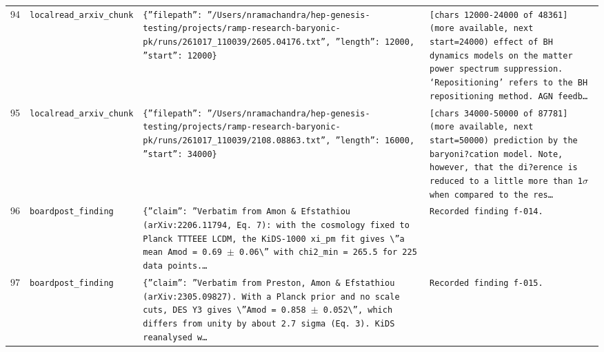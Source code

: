 \documentclass[11pt,a4paper]{article}
\begin{document}
\begin{longtable}{@{}p{}p{}p{}p{}@{}}
94 & \texttt{local}\newline\texttt{read\_\allowbreak{}arxiv\_\allowbreak{}chunk} & \texttt{\{''filepath'':\allowbreak{} ''/\allowbreak{}Users/\allowbreak{}nramachandra/\allowbreak{}hep-genesis-testing/\allowbreak{}projects/\allowbreak{}ramp-research-baryonic-pk/\allowbreak{}runs/\allowbreak{}261017\_\allowbreak{}110039/\allowbreak{}2605.04176.txt'',\allowbreak{} ''length'':\allowbreak{} 12000,\allowbreak{} ''start'':\allowbreak{} 12000\}\allowbreak{}} & \texttt{[chars 12000-24000 of 48361]\allowbreak{} (more available,\allowbreak{} next start=\allowbreak{}24000)\allowbreak{}  effect of BH dynamics models on the matter power spectrum suppression. `Repositioning' refers to the BH repositioning method. AGN feedb\ldots{}\allowbreak{}} \\
95 & \texttt{local}\newline\texttt{read\_\allowbreak{}arxiv\_\allowbreak{}chunk} & \texttt{\{''filepath'':\allowbreak{} ''/\allowbreak{}Users/\allowbreak{}nramachandra/\allowbreak{}hep-genesis-testing/\allowbreak{}projects/\allowbreak{}ramp-research-baryonic-pk/\allowbreak{}runs/\allowbreak{}261017\_\allowbreak{}110039/\allowbreak{}2108.08863.txt'',\allowbreak{} ''length'':\allowbreak{} 16000,\allowbreak{} ''start'':\allowbreak{} 34000\}\allowbreak{}} & \texttt{[chars 34000-50000 of 87781]\allowbreak{} (more available,\allowbreak{} next start=\allowbreak{}50000)\allowbreak{}   prediction by the baryoni?cation model. Note,\allowbreak{} however,\allowbreak{} that the di?erence is reduced to a little more than 1$\sigma$ when compared to the res\ldots{}\allowbreak{}} \\
96 & \texttt{board}\newline\texttt{post\_\allowbreak{}finding} & \texttt{\{''claim'':\allowbreak{} ''Verbatim from Amon \& Efstathiou (arXiv:\allowbreak{}2206.11794,\allowbreak{} Eq. 7)\allowbreak{}:\allowbreak{} with the cosmology fixed to Planck TTTEEE LCDM,\allowbreak{} the KiDS-1000 xi\_\allowbreak{}pm fit gives \textbackslash{}\allowbreak{}''a mean Amod =\allowbreak{} 0.69 $\pm$ 0.06\textbackslash{}\allowbreak{}'' with chi2\_\allowbreak{}min =\allowbreak{} 265.5 for 225 data points.\ldots{}\allowbreak{}} & \texttt{Recorded finding f-014.} \\
97 & \texttt{board}\newline\texttt{post\_\allowbreak{}finding} & \texttt{\{''claim'':\allowbreak{} ''Verbatim from Preston,\allowbreak{} Amon \& Efstathiou (arXiv:\allowbreak{}2305.09827)\allowbreak{}. With a Planck prior and no scale cuts,\allowbreak{} DES Y3 gives \textbackslash{}\allowbreak{}''Amod =\allowbreak{} 0.858 $\pm$ 0.052\textbackslash{}\allowbreak{}'',\allowbreak{} which differs from unity by about 2.7 sigma (Eq. 3)\allowbreak{}. KiDS reanalysed w\ldots{}\allowbreak{}} & \texttt{Recorded finding f-015.} \\

\end{longtable}
\end{document}

